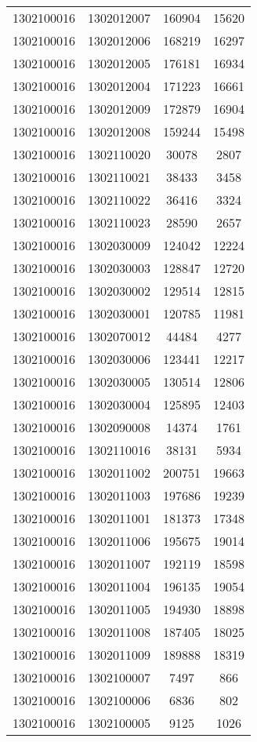 \begin{longtable}{llcc}
1302100016 & 1302012007 & 160904 & 15620\\
1302100016 & 1302012006 & 168219 & 16297\\
1302100016 & 1302012005 & 176181 & 16934\\
1302100016 & 1302012004 & 171223 & 16661\\
1302100016 & 1302012009 & 172879 & 16904\\
1302100016 & 1302012008 & 159244 & 15498\\
1302100016 & 1302110020 & 30078 & 2807\\
1302100016 & 1302110021 & 38433 & 3458\\
1302100016 & 1302110022 & 36416 & 3324\\
1302100016 & 1302110023 & 28590 & 2657\\
1302100016 & 1302030009 & 124042 & 12224\\
1302100016 & 1302030003 & 128847 & 12720\\
1302100016 & 1302030002 & 129514 & 12815\\
1302100016 & 1302030001 & 120785 & 11981\\
1302100016 & 1302070012 & 44484 & 4277\\
1302100016 & 1302030006 & 123441 & 12217\\
1302100016 & 1302030005 & 130514 & 12806\\
1302100016 & 1302030004 & 125895 & 12403\\
1302100016 & 1302090008 & 14374 & 1761\\
1302100016 & 1302110016 & 38131 & 5934\\
1302100016 & 1302011002 & 200751 & 19663\\
1302100016 & 1302011003 & 197686 & 19239\\
1302100016 & 1302011001 & 181373 & 17348\\
1302100016 & 1302011006 & 195675 & 19014\\
1302100016 & 1302011007 & 192119 & 18598\\
1302100016 & 1302011004 & 196135 & 19054\\
1302100016 & 1302011005 & 194930 & 18898\\
1302100016 & 1302011008 & 187405 & 18025\\
1302100016 & 1302011009 & 189888 & 18319\\
1302100016 & 1302100007 & 7497 & 866\\
1302100016 & 1302100006 & 6836 & 802\\
1302100016 & 1302100005 & 9125 & 1026\\

\end{longtable}
